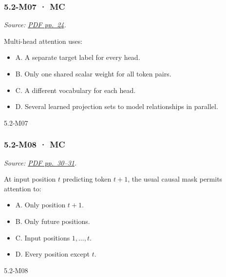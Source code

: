 \noindent\begin{minipage}{\linewidth}

\subsubsection{5.2-M07 · MC}\label{m07-mc-13}

\emph{Source:
\href{../Lecture\%20Slides/5.2.\%20Transformers.pdf\#page=24}{PDF
pp.~24}.}

Multi-head attention uses:

\begin{itemize}
\tightlist
\item
  A. A separate target label for every head.
\item
  B. Only one shared scalar weight for all token pairs.
\item
  C. A different vocabulary for each head.
\item
  D. Several learned projection sets to model relationships in parallel.
\end{itemize}

\begin{solution}[8mm]{5.2-M07}

\end{solution}
\end{minipage}\par\medskip

\noindent\begin{minipage}{\linewidth}

\subsubsection{5.2-M08 · MC}\label{m08-mc-13}

\emph{Source:
\href{../Lecture\%20Slides/5.2.\%20Transformers.pdf\#page=30}{PDF
pp.~30--31}.}

At input position \(t\) predicting token \(t+1\), the usual causal mask
permits attention to:

\begin{itemize}
\tightlist
\item
  A. Only position \(t+1\).
\item
  B. Only future positions.
\item
  C. Input positions \(1,\ldots,t\).
\item
  D. Every position except \(t\).
\end{itemize}

\begin{solution}[8mm]{5.2-M08}

\end{solution}
\end{minipage}\par\medskip

